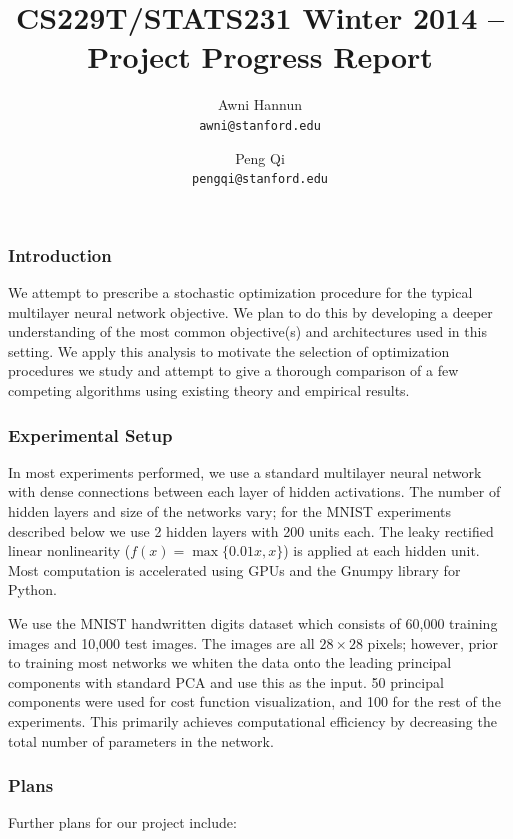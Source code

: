 \documentclass[12pt,english]{article}
\title{
{\large CS229T/STATS231 Winter 2014 -- Project Progress Report }
}
\author{ \large
Awni Hannun \\
\texttt{awni@stanford.edu}
\and
Peng Qi \\
\texttt{pengqi@stanford.edu}
}
\date{}
\newcommand{\1}{\mathbb{I}} %
\begin{document}
\maketitle

\subsubsection*{Introduction}
We attempt to prescribe a stochastic optimization procedure for the typical
multilayer neural network objective. We plan to do this by developing a deeper
understanding of the most common objective(s) and architectures used in this
setting. We apply this analysis to motivate the selection of optimization
procedures we study and attempt to give a thorough comparison of a few
competing algorithms using existing theory and empirical results. 

\subsubsection*{Experimental Setup}

In most experiments performed, we use a standard multilayer neural network with
dense connections between each layer of hidden activations. The number of
hidden layers and size of the networks vary; for the MNIST experiments
described below we use 2 hidden layers with 200 units each. The leaky rectified
linear nonlinearity ($f(x) = \max\{0.01x,x\}$) is applied at each hidden unit.
Most computation is accelerated using GPUs and the Gnumpy library for Python. 

We use the MNIST handwritten digits dataset which consists of 60,000 training
images and 10,000 test images. The images are all $28\times28$ pixels; however,
prior to training most networks we whiten the data onto the leading principal
components with standard PCA and use this as the input.
50 principal components were used for cost function visualization, and 100 
for the rest of the experiments. This primarily achieves
computational efficiency by decreasing the total number of parameters in the
network. 




\subsubsection*{Plans}

Further plans for our project include:
\end{document}

